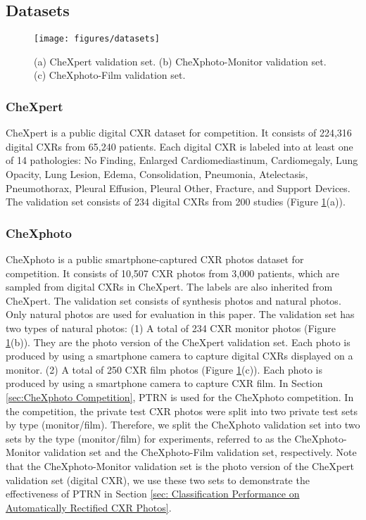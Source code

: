 \documentclass[preprint, 12pt]{elsarticle}
\begin{document}
\subsection{Datasets}

\begin{figure}
    \centering
    \texttt{[image: figures/datasets]}
    \caption{(a) CheXpert validation set. (b) CheXphoto-Monitor validation set. (c) CheXphoto-Film validation set.}
    \label{fig:datasets}
\end{figure}

\subsubsection{CheXpert}

CheXpert \cite{irvin2019chexpert} is a public digital CXR dataset for competition. It consists of 224,316 digital CXRs from 65,240 patients. Each digital CXR is labeled into at least one of 14 pathologies: No Finding, Enlarged Cardiomediastinum, Cardiomegaly, Lung Opacity, Lung Lesion, Edema, Consolidation, Pneumonia, Atelectasis, Pneumothorax, Pleural Effusion, Pleural Other, Fracture, and Support Devices. The validation set consists of 234 digital CXRs from 200 studies (Figure \ref{fig:datasets}(a)).

\subsubsection{CheXphoto}

CheXphoto \cite{phillips2020chexphoto} is a public smartphone-captured CXR photos dataset for competition. It consists of 10,507 CXR photos from 3,000 patients, which are sampled from digital CXRs in CheXpert. The labels are also inherited from CheXpert. The validation set consists of synthesis photos and natural photos. Only natural photos are used for evaluation in this paper. The validation set has two types of natural photos: (1) A total of 234 CXR monitor photos (Figure \ref{fig:datasets}(b)). They are the photo version of the CheXpert validation set. Each photo is produced by using a smartphone camera to capture digital CXRs displayed on a monitor. (2) A total of 250 CXR film photos (Figure \ref{fig:datasets}(c)). Each photo is produced by using a smartphone camera to capture CXR film. In Section \ref{sec:CheXphoto Competition}, PTRN is used for the CheXphoto competition. In the competition, the private test CXR photos were split into two private test sets by type (monitor/film). Therefore, we split the CheXphoto validation set into two sets by the type (monitor/film) for experiments, referred to as the CheXphoto-Monitor validation set and the CheXphoto-Film validation set, respectively. Note that the CheXphoto-Monitor validation set is the photo version of the CheXpert validation set (digital CXR), we use these two sets to demonstrate the effectiveness of PTRN in Section \ref{sec: Classification Performance on Automatically Rectified CXR Photos}.
\end{document}
